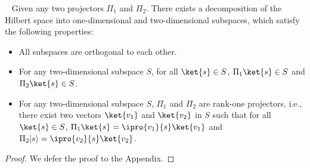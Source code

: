 
\begin{lemma}~\label{lemma:Jordan}
Given any two projectors $\Pi_1$ and $\Pi_2$. There exists a decomposition of the Hilbert space into one-dimensional and two-dimensional subspaces, which satisfy the following properties: 
\begin{itemize}
    \item All subspaces are orthogonal to each other.
    \item For any two-dimensional subspace $S$, for all $\ket{s}\in S$, $\Pi_1 \ket{s} \in S$ and $\Pi_2 \ket{s} \in S$.
    \item For any two-dimensional subspace $S$, $\Pi_1$ and $\Pi_2$ are rank-one projectors, i.e., there exist two vectors $\ket{v_1}$ and $\ket{v_2}$ in $S$ such that for all $ \ket{s}\in S$,  $\Pi_1 \ket{s} = \ipro{v_1}{s}\ket{v_1}$ and $\Pi_2 |s\rangle =\ipro{v_2}{s}\ket{v_2}$. 
\end{itemize}
\end{lemma}
\begin{proof}
We defer the proof to the Appendix. 
\end{proof}

